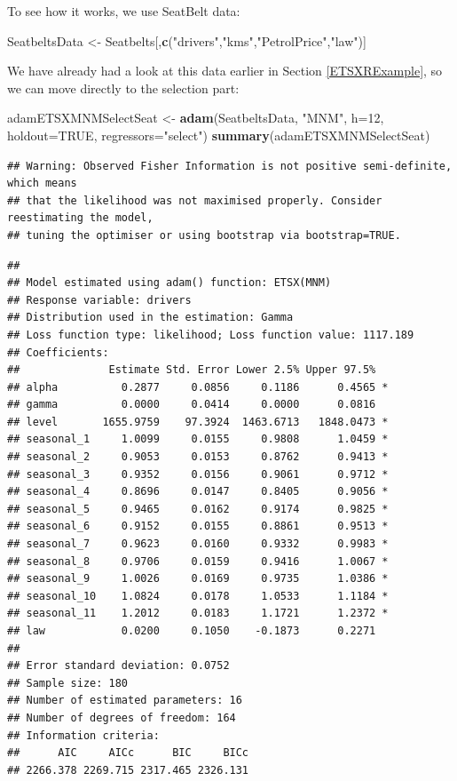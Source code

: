 \documentclass[]{book}
\newenvironment{Shaded}{\begin{snugshade}}{\end{snugshade}}
\newcommand{\DataTypeTok}[1]{\textcolor[rgb]{0.13,0.29,0.53}{#1}}
\newcommand{\DecValTok}[1]{\textcolor[rgb]{0.00,0.00,0.81}{#1}}
\newcommand{\KeywordTok}[1]{\textcolor[rgb]{0.13,0.29,0.53}{\textbf{#1}}}
\newcommand{\NormalTok}[1]{#1}
\newcommand{\OtherTok}[1]{\textcolor[rgb]{0.56,0.35,0.01}{#1}}
\newcommand{\StringTok}[1]{\textcolor[rgb]{0.31,0.60,0.02}{#1}}
\theoremstyle{definition}
\theoremstyle{definition}
\theoremstyle{definition}
\theoremstyle{definition}
\theoremstyle{remark}
\begin{document}
To see how it works, we use SeatBelt data:

\begin{Shaded}
\begin{Highlighting}[]
\NormalTok{SeatbeltsData <-}\StringTok{ }\NormalTok{Seatbelts[,}\KeywordTok{c}\NormalTok{(}\StringTok{"drivers"}\NormalTok{,}\StringTok{"kms"}\NormalTok{,}\StringTok{"PetrolPrice"}\NormalTok{,}\StringTok{"law"}\NormalTok{)]}
\end{Highlighting}
\end{Shaded}

We have already had a look at this data earlier in Section \ref{ETSXRExample}, so we can move directly to the selection part:

\begin{Shaded}
\begin{Highlighting}[]
\NormalTok{adamETSXMNMSelectSeat <-}\StringTok{ }\KeywordTok{adam}\NormalTok{(SeatbeltsData, }\StringTok{"MNM"}\NormalTok{,}
                               \DataTypeTok{h=}\DecValTok{12}\NormalTok{, }\DataTypeTok{holdout=}\OtherTok{TRUE}\NormalTok{,}
                               \DataTypeTok{regressors=}\StringTok{"select"}\NormalTok{)}
\KeywordTok{summary}\NormalTok{(adamETSXMNMSelectSeat)}
\end{Highlighting}
\end{Shaded}

\begin{verbatim}
## Warning: Observed Fisher Information is not positive semi-definite, which means
## that the likelihood was not maximised properly. Consider reestimating the model,
## tuning the optimiser or using bootstrap via bootstrap=TRUE.
\end{verbatim}

\begin{verbatim}
## 
## Model estimated using adam() function: ETSX(MNM)
## Response variable: drivers
## Distribution used in the estimation: Gamma
## Loss function type: likelihood; Loss function value: 1117.189
## Coefficients:
##              Estimate Std. Error Lower 2.5% Upper 97.5%  
## alpha          0.2877     0.0856     0.1186      0.4565 *
## gamma          0.0000     0.0414     0.0000      0.0816  
## level       1655.9759    97.3924  1463.6713   1848.0473 *
## seasonal_1     1.0099     0.0155     0.9808      1.0459 *
## seasonal_2     0.9053     0.0153     0.8762      0.9413 *
## seasonal_3     0.9352     0.0156     0.9061      0.9712 *
## seasonal_4     0.8696     0.0147     0.8405      0.9056 *
## seasonal_5     0.9465     0.0162     0.9174      0.9825 *
## seasonal_6     0.9152     0.0155     0.8861      0.9513 *
## seasonal_7     0.9623     0.0160     0.9332      0.9983 *
## seasonal_8     0.9706     0.0159     0.9416      1.0067 *
## seasonal_9     1.0026     0.0169     0.9735      1.0386 *
## seasonal_10    1.0824     0.0178     1.0533      1.1184 *
## seasonal_11    1.2012     0.0183     1.1721      1.2372 *
## law            0.0200     0.1050    -0.1873      0.2271  
## 
## Error standard deviation: 0.0752
## Sample size: 180
## Number of estimated parameters: 16
## Number of degrees of freedom: 164
## Information criteria:
##      AIC     AICc      BIC     BICc 
## 2266.378 2269.715 2317.465 2326.131
\end{verbatim}
\end{document}
